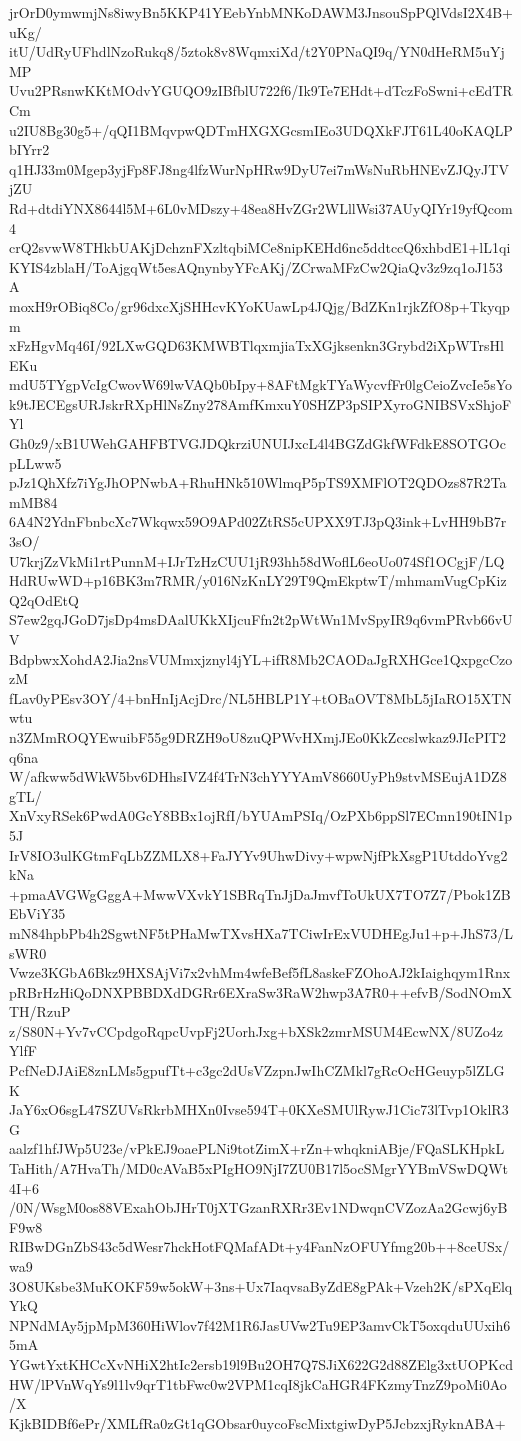 jrOrD0ymwmjNs8iwyBn5KKP41YEebYnbMNKoDAWM3JnsouSpPQlVdsI2X4B+uKg/
itU/UdRyUFhdlNzoRukq8/5ztok8v8WqmxiXd/t2Y0PNaQI9q/YN0dHeRM5uYjMP
Uvu2PRsnwKKtMOdvYGUQO9zIBfblU722f6/Ik9Te7EHdt+dTczFoSwni+cEdTRCm
u2IU8Bg30g5+/qQI1BMqvpwQDTmHXGXGcsmIEo3UDQXkFJT61L40oKAQLPbIYrr2
q1HJ33m0Mgep3yjFp8FJ8ng4lfzWurNpHRw9DyU7ei7mWsNuRbHNEvZJQyJTVjZU
Rd+dtdiYNX8644l5M+6L0vMDszy+48ea8HvZGr2WLllWsi37AUyQIYr19yfQcom4
crQ2svwW8THkbUAKjDchznFXzltqbiMCe8nipKEHd6nc5ddtccQ6xhbdE1+lL1qi
KYIS4zblaH/ToAjgqWt5esAQnynbyYFcAKj/ZCrwaMFzCw2QiaQv3z9zq1oJ153A
moxH9rOBiq8Co/gr96dxcXjSHHcvKYoKUawLp4JQjg/BdZKn1rjkZfO8p+Tkyqpm
xFzHgvMq46I/92LXwGQD63KMWBTlqxmjiaTxXGjksenkn3Grybd2iXpWTrsHlEKu
mdU5TYgpVcIgCwovW69lwVAQb0bIpy+8AFtMgkTYaWycvfFr0lgCeioZvcIe5sYo
k9tJECEgsURJskrRXpHlNsZny278AmfKmxuY0SHZP3pSIPXyroGNIBSVxShjoFYl
Gh0z9/xB1UWehGAHFBTVGJDQkrziUNUIJxcL4l4BGZdGkfWFdkE8SOTGOcpLLww5
pJz1QhXfz7iYgJhOPNwbA+RhuHNk510WlmqP5pTS9XMFlOT2QDOzs87R2TamMB84
6A4N2YdnFbnbcXc7Wkqwx59O9APd02ZtRS5cUPXX9TJ3pQ3ink+LvHH9bB7r3sO/
U7krjZzVkMi1rtPunnM+IJrTzHzCUU1jR93hh58dWoflL6eoUo074Sf1OCgjF/LQ
HdRUwWD+p16BK3m7RMR/y016NzKnLY29T9QmEkptwT/mhmamVugCpKizQ2qOdEtQ
S7ew2gqJGoD7jsDp4msDAalUKkXIjcuFfn2t2pWtWn1MvSpyIR9q6vmPRvb66vUV
BdpbwxXohdA2Jia2nsVUMmxjznyl4jYL+ifR8Mb2CAODaJgRXHGce1QxpgcCzozM
fLav0yPEsv3OY/4+bnHnIjAcjDrc/NL5HBLP1Y+tOBaOVT8MbL5jIaRO15XTNwtu
n3ZMmROQYEwuibF55g9DRZH9oU8zuQPWvHXmjJEo0KkZccslwkaz9JIcPIT2q6na
W/afkww5dWkW5bv6DHhsIVZ4f4TrN3chYYYAmV8660UyPh9stvMSEujA1DZ8gTL/
XnVxyRSek6PwdA0GcY8BBx1ojRfI/bYUAmPSIq/OzPXb6ppSl7ECmn190tIN1p5J
IrV8IO3ulKGtmFqLbZZMLX8+FaJYYv9UhwDivy+wpwNjfPkXsgP1UtddoYvg2kNa
+pmaAVGWgGggA+MwwVXvkY1SBRqTnJjDaJmvfToUkUX7TO7Z7/Pbok1ZBEbViY35
mN84hpbPb4h2SgwtNF5tPHaMwTXvsHXa7TCiwIrExVUDHEgJu1+p+JhS73/LsWR0
Vwze3KGbA6Bkz9HXSAjVi7x2vhMm4wfeBef5fL8askeFZOhoAJ2kIaighqym1Rnx
pRBrHzHiQoDNXPBBDXdDGRr6EXraSw3RaW2hwp3A7R0++efvB/SodNOmXTH/RzuP
z/S80N+Yv7vCCpdgoRqpcUvpFj2UorhJxg+bXSk2zmrMSUM4EcwNX/8UZo4zYlfF
PcfNeDJAiE8znLMs5gpufTt+c3gc2dUsVZzpnJwIhCZMkl7gRcOcHGeuyp5lZLGK
JaY6xO6sgL47SZUVsRkrbMHXn0Ivse594T+0KXeSMUlRywJ1Cic73lTvp1OklR3G
aalzf1hfJWp5U23e/vPkEJ9oaePLNi9totZimX+rZn+whqkniABje/FQaSLKHpkL
TaHith/A7HvaTh/MD0cAVaB5xPIgHO9NjI7ZU0B17l5ocSMgrYYBmVSwDQWt4I+6
/0N/WsgM0os88VExahObJHrT0jXTGzanRXRr3Ev1NDwqnCVZozAa2Gcwj6yBF9w8
RIBwDGnZbS43c5dWesr7hckHotFQMafADt+y4FanNzOFUYfmg20b++8ceUSx/wa9
3O8UKsbe3MuKOKF59w5okW+3ns+Ux7IaqvsaByZdE8gPAk+Vzeh2K/sPXqElqYkQ
NPNdMAy5jpMpM360HiWlov7f42M1R6JasUVw2Tu9EP3amvCkT5oxqduUUxih65mA
YGwtYxtKHCcXvNHiX2htIc2ersb19l9Bu2OH7Q7SJiX622G2d88ZElg3xtUOPKcd
HW/lPVnWqYs9l1lv9qrT1tbFwc0w2VPM1cqI8jkCaHGR4FKzmyTnzZ9poMi0Ao/X
KjkBIDBf6ePr/XMLfRa0zGt1qGObsar0uycoFscMixtgiwDyP5JcbzxjRyknABA+
